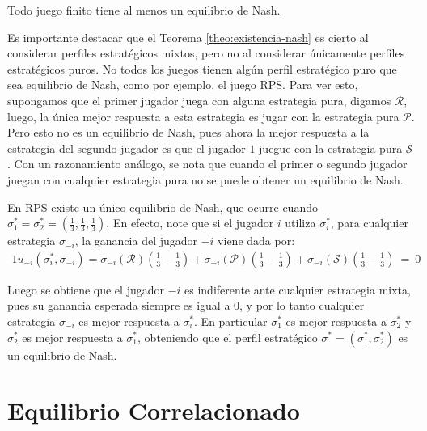 \begin{theorem}
\label{theo:existencia-nash}
Todo juego finito tiene al menos un equilibrio de Nash.
\end{theorem}

Es importante destacar que el Teorema \ref{theo:existencia-nash} es cierto al considerar perfiles estratégicos mixtos, pero no al considerar únicamente perfiles estratégicos puros. No todos los juegos tienen algún perfil estratégico puro que sea equilibrio de Nash, como por ejemplo, el juego RPS. Para ver esto, supongamos que el primer jugador juega con alguna estrategia pura, digamos $\mathcal{R}$, luego, la única mejor respuesta a esta estrategia es jugar con la estrategia pura $\mathcal{P}$. Pero esto no es un equilibrio de Nash, pues ahora la mejor respuesta a la estrategia del segundo jugador es que el jugador $1$ juegue con la estrategia pura $\mathcal{S}$. Con un razonamiento análogo, se nota que cuando el primer o segundo jugador juegan con cualquier estrategia pura no se puede obtener un equilibrio de Nash.

En RPS existe un único equilibrio de Nash, que ocurre cuando $\sigma^*_1 = \sigma^*_2 = \left(\frac{1}{3}, \frac{1}{3}, \frac{1}{3} \right)$. En efecto, note que si el jugador $i$ utiliza $\sigma^*_i$, para cualquier estrategia $\sigma_{-i}$, la ganancia del jugador $-i$ viene dada por:
\begin{alignat}{1}
	u_{-i}(\sigma^*_i, \sigma_{-i}) = \sigma_{-i}(\mathcal{R}) \left( \frac{1}{3} -  \frac{1}{3} \right) + \sigma_{-i}(\mathcal{P}) \left( \frac{1}{3} -  \frac{1}{3} \right) + \sigma_{-i}(\mathcal{S}) \left( \frac{1}{3} -  \frac{1}{3} \right)\ =\ 0
\end{alignat}

Luego se obtiene que el jugador $-i$ es indiferente ante cualquier estrategia mixta, pues su ganancia esperada siempre es igual a $0$, y por lo tanto cualquier estrategia $\sigma_{-i}$ es mejor respuesta a $\sigma^*_i$. En particular $\sigma^*_1$ es mejor respuesta a $\sigma^*_2$ y $\sigma^*_2$ es mejor respuesta a $\sigma^*_1$, obteniendo que el perfil estratégico $\sigma^* = (\sigma^*_1, \sigma^*_2)$ es un equilibrio de Nash.


\section{Equilibrio Correlacionado}
\label{section:equilibrio-correlacionado}

